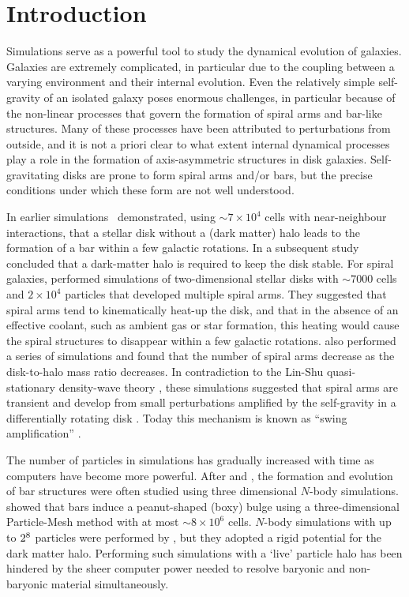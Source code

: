 
\section{Introduction}

Simulations serve as a powerful tool to study the dynamical evolution
of galaxies. Galaxies are extremely complicated, in particular due to
the coupling between a varying environment and their internal
evolution.  Even the relatively simple self-gravity of an isolated
galaxy poses enormous challenges, in particular because of the
non-linear processes that govern the formation of spiral arms and
bar-like structures.  Many of these processes have been attributed to
perturbations from outside, and it is not a priori clear to what
extent internal dynamical processes play a role in the formation of
axis-asymmetric structures in disk galaxies.  Self-gravitating disks
are prone to form spiral arms and/or bars, but the precise conditions
under which these form are not well understood.

In earlier simulations~\citet{1971ApJ...168..343H} demonstrated, using
$\sim 7\times 10^4$ cells with near-neighbour interactions, that a 
stellar disk
without a (dark matter) halo leads to the formation of a bar within a
few galactic rotations.  In a subsequent
study~\citet{1973ApJ...186..467O} concluded that a dark-matter halo is
required to keep the disk stable.  For spiral galaxies,
\citet{1984ApJ...282...61S} performed simulations of two-dimensional 
stellar disks with $\sim 7000$ cells and $2\times 10^4$ particles
that developed multiple spiral arms. 
They suggested that spiral arms
tend to kinematically heat-up the disk, and that in the absence of an
effective coolant, such as ambient gas or star formation, this heating
would cause the spiral structures to disappear within a few galactic
rotations. \citet{1985ApJ...298..486C} also performed a series of 
simulations and found that the number of spiral arms decrease as
the disk-to-halo mass ratio decreases. 
In contradiction to the Lin-Shu quasi-stationary density-wave theory
\citep{1964ApJ...140..646L}, these simulations suggested that 
spiral arms are transient and develop from small perturbations
amplified by the self-gravity in a differentially rotating disk
\citep{1965MNRAS.130..125G, 1966ApJ...146..810J}.
Today this mechanism is known as ``swing amplification''
\citep{1981seng.proc..111T,2016ApJ...823..121M}.

The number of particles in simulations has gradually
increased with time as computers have become more powerful.  
After \citet{1984ApJ...282...61S} and
\citet{1985ApJ...298..486C}, the formation and evolution of bar
structures were often studied using three dimensional $N$-body
simulations. \citet{1990A&A...233...82C} showed that bars induce a
peanut-shaped (boxy) bulge using a three-dimensional Particle-Mesh
method with at most $\sim 8\times 10^6$ cells.  $N$-body simulations
with up to $2\time 10^8$ particles were performed by
\citet{2014ApJ...785..137S}, but they adopted a rigid potential for
the dark matter halo.  Performing such simulations with a `live'
particle halo has been hindered by the sheer computer power needed to
resolve baryonic and non-baryonic material simultaneously.

